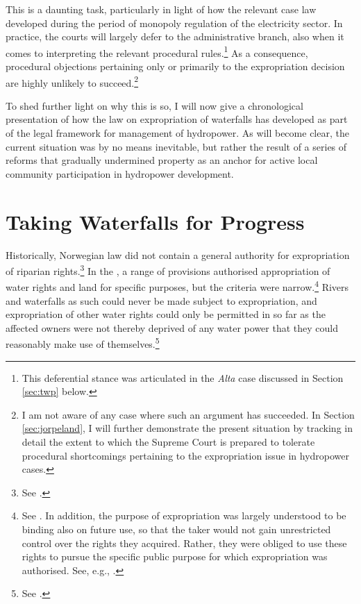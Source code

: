 This is a daunting task, particularly in light of how the relevant case law developed during the period of monopoly regulation of the electricity sector. In practice, the courts will largely defer to the administrative branch, also when it comes to interpreting the relevant procedural rules.\footnote{This  deferential stance was articulated in the {\it Alta} case discussed in Section \ref{sec:twp} below.} As a consequence, procedural objections pertaining only or primarily to the expropriation decision are highly unlikely to succeed.\footnote{I am not aware of any case where such an argument has succeeded. In Section \ref{sec:jorpeland}, I will further demonstrate the present situation by tracking in detail the extent to which the Supreme Court is prepared to tolerate procedural shortcomings pertaining to the expropriation issue in hydropower cases.}

To shed further light on why this is so, I will now give a chronological presentation of how the law on expropriation of waterfalls has developed as part of the legal framework for management of hydropower. As will become clear, the current situation was by no means inevitable, but rather the result of a series of reforms that gradually undermined property as an anchor for active local community participation in hydropower development.

\section{Taking Waterfalls for Progress}\label{sec:4}

Historically, Norwegian law did not contain a general authority for expropriation of riparian rights.\footnote{See \cite[29]{amundsen28}.} In the \cite{wra88}, a range of provisions authorised appropriation of water rights and land for specific purposes, but the criteria were narrow.\footnote{See \cite[69-85]{dahl88}. In addition, the purpose of expropriation was largely understood to be binding also on future use, so that the taker would not gain unrestricted control over the rights they acquired. Rather, they were obliged to use these rights to pursue the specific public purpose for which expropriation was authorised. See, e.g., \cite[133-140]{rygh12}.} Rivers and waterfalls as such could never be made subject to expropriation, and expropriation of other water rights could only be permitted in so far as the affected owners were not thereby deprived of any water power that they could reasonably make use of themselves.\footnote{See \cite[58|60]{dahl88}.}

